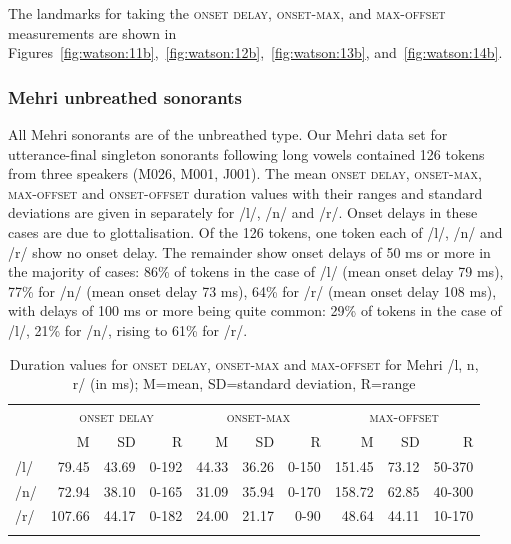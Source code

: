 \documentclass[output=paper]{langscibook}
\begin{document}
The landmarks for taking the \textsc{onset} \textsc{delay,} \textsc{onset-max,} and \textsc{max-offset} measurements are shown in Figures~\ref{fig:watson:11b},~\ref{fig:watson:12b},~\ref{fig:watson:13b}, and~\ref{fig:watson:14b}.

\subsubsection{Mehri unbreathed sonorants} %
\label{sec:watson:4.3.2}
All Mehri sonorants are of the unbreathed type. Our Mehri data set for utterance-final singleton sonorants following long vowels contained 126 tokens from three speakers (M026, M001, J001). The mean \textsc{onset} \textsc{delay}, \textsc{onset-max}, \textsc{max\hyp offset} and \textsc{onset-offset} duration values with their ranges and standard deviations are given in  separately for \mbox{/l/}, \mbox{/n/} and \mbox{/r/}. Onset delays in these cases are due to glottalisation. Of the 126 tokens, one token each of \mbox{/l/}, \mbox{/n/} and \mbox{/r/} show no onset delay. The remainder show onset delays of 50 ms or more in the majority of cases: 86\% of tokens in the case of \mbox{/l/} (mean onset delay 79 ms), 77\% for \mbox{/n/} (mean onset delay 73 ms), 64\% for \mbox{/r/} (mean onset delay 108 ms), with delays of 100 ms or more being quite common: 29\% of tokens in the case of \mbox{/l/}, 21\% for \mbox{/n/}, rising to 61\% for \mbox{/r/}.

\begin{table}[h]
\caption{Duration values for \textsc{onset delay}, \textsc{onset-max} and \textsc{max-offset} for Mehri /l, n, r/ (in ms); M=mean, SD=standard deviation, R=range}
\label{tab:watson:7}
\begin{tabularx}{\textwidth}{l@{~}rrr rrr rrr}
\lsptoprule
 & \multicolumn{3}{c}{\textsc{onset} \textsc{delay}} & \multicolumn{3}{c}{\textsc{onset-max}} & \multicolumn{3}{c}{\textsc{max-offset}}\\
 \cmidrule(lr){2-4}\cmidrule(lr){5-7}\cmidrule(lr){8-10}
& M & SD & R & M & SD & R & M & SD & R\\
\midrule
/l/ & 79.45 & 43.69 & 0-192 & 44.33 & 36.26 & 0-150 & 151.45 & 73.12 & 50-370\\
/n/ & 72.94 & 38.10 & 0-165 & 31.09 & 35.94 & 0-170 & 158.72 & 62.85 & 40-300\\
/r/ & 107.66 & 44.17 & 0-182 & 24.00 & 21.17 & 0-90 & 48.64 & 44.11 & 10-170\\
\lspbottomrule
\end{tabularx}
\end{table}
\end{document}

